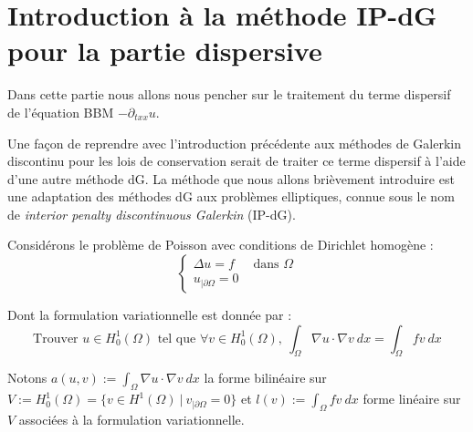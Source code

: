 \section{Introduction à la méthode IP-dG pour la partie dispersive}

Dans cette partie nous allons nous pencher sur le traitement du terme dispersif de l'équation BBM $-\partial_{txx}u$.

Une façon de reprendre avec l'introduction précédente aux méthodes de Galerkin discontinu pour les lois de conservation serait de traiter ce terme dispersif à l'aide d'une autre méthode dG.
La méthode que nous allons brièvement introduire est une adaptation des méthodes dG aux problèmes elliptiques, connue sous le nom de \textit{interior penalty discontinuous Galerkin} (IP-dG).

\vspace{1em}




Considérons le problème de Poisson avec conditions de Dirichlet homogène :
$$\begin{cases}
    \Delta u = f &\text{ dans } \Omega \\
    u_{|\partial \Omega} = 0
\end{cases}$$

Dont la formulation variationnelle est donnée par :
$$\text{Trouver } u\in H^1_0(\Omega) \text{ tel que } \forall v\in H^1_0(\Omega), \ \int_{\Omega} \nabla u \cdot \nabla v \ dx = \int_{\Omega} fv \ dx $$

Notons $\displaystyle a(u,v) := \int_{\Omega} \nabla u \cdot \nabla v \ dx$ la forme bilinéaire sur $V := H^1_0(\Omega) = \big\{ v \in H^1(\Omega) \ \big | \ v_{|\partial \Omega} = 0 \big\} $ et $\displaystyle l(v) := \int_{\Omega} fv \ dx$ forme linéaire sur $V$ associées à la formulation variationnelle.

